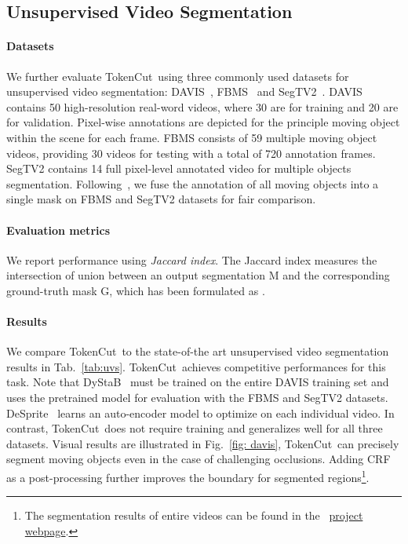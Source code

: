 \documentclass[twocolumn]{article}
\newcommand{\name} {TokenCut}
\begin{document}
\subsection{Unsupervised Video Segmentation}
\label{sec:UVS}
\paragraph*{Datasets}
We further evaluate \name~using three commonly used datasets for unsupervised video segmentation: DAVIS~\cite{perazzi2016benchmark}, FBMS~\cite{ochs2013segmentation} and SegTV2~\cite{li2013video}.
DAVIS contains 50 high-resolution real-word videos, where 30 are for training and 20 are for validation. Pixel-wise annotations are depicted for the principle moving object within the scene for each frame. FBMS consists of 59 multiple moving object videos, providing 30 videos for testing with a total of 720 annotation frames. SegTV2 contains 14 full pixel-level annotated video for multiple objects segmentation. Following~\cite{yang2021self}, we fuse the annotation of all moving objects into a single mask on FBMS and SegTV2 datasets for fair comparison.

\paragraph*{Evaluation metrics} 
We report performance using \textit{Jaccard index}. The Jaccard index measures the intersection of union between an output segmentation M and the corresponding ground-truth mask G, which has been formulated as .

 
\paragraph*{Results}
We compare \name~to the state-of-the art unsupervised video segmentation results in Tab.~\ref{tab:uvs}. \name~achieves competitive performances for this task. Note that DyStaB~\cite{yang2021dystab} must be trained on the entire DAVIS training set and uses the pretrained model for evaluation with the FBMS and SegTV2 datasets. DeSprite~\cite{ye2022deformable} learns an auto-encoder model to optimize on each individual video. In contrast,  \name~does not require training  and generalizes well for all three datasets. Visual results are illustrated in Fig.~\ref{fig: davis}, \name~can precisely segment moving objects even in the case of challenging occlusions. Adding CRF as a post-processing further improves  the boundary for segmented regions\footnote{The segmentation results of entire videos can be found in the ~\href{https://www.m-psi.fr/Papers/TokenCut2022/}{project webpage}.}. 
\end{document}
